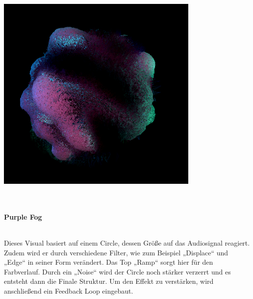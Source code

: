 \documentclass[12pt]{scrartcl}%
\theoremstyle{nonumberplain}
\begin{document}
\begin{minipage}{0.5\textwidth}
  \centering
  \includegraphics[width=\textwidth]{td_4}
\end{minipage}
\\\\
\textbf{Purple Fog}\\\\
\begin{minipage}{0.4\textwidth}
Dieses Visual basiert auf einem Circle, dessen Größe auf das Audiosignal reagiert. Zudem wird er durch verschiedene Filter, wie zum Beispiel „Displace“ und „Edge“ in seiner Form verändert. Das Top „Ramp“ sorgt hier für den Farbverlauf. Durch ein „Noise“ wird der Circle noch stärker verzerrt und es entsteht dann die Finale Struktur. Um den Effekt zu verstärken, wird anschließend ein Feedback Loop eingebaut.
\vspace{1pt}
\end{minipage}
\hspace{20pt}
\end{document}
